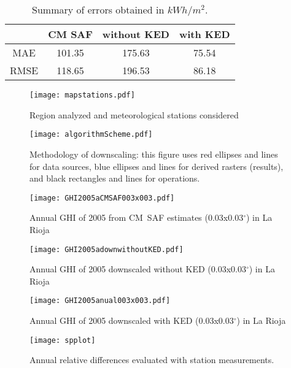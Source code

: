 \documentclass[authoryear, sort&compress]{elsarticle}
\begin{document}
\begin{table}[ht]
\begin{center}
\begin{tabular}{cccc}
  \hline
& CM SAF & without KED & with KED\\
\hline
MAE & 101.35 &  175.63& 75.54  \\ 
  RMSE & 118.65  & 196.53 & 86.18 \\ 
   \hline
\end{tabular}
\end{center}
\caption{Summary of errors obtained in $kWh/m^2$.}
\label{tab:ers}
\end{table}

\begin{figure}
\centering
\texttt{[image: mapstations.pdf]}
\caption{Region analyzed and meteorological stations considered}
\label{fig:mapstations}
\end{figure}

\begin{figure}
\centering
\texttt{[image: algorithmScheme.pdf]}
\caption{Methodology of downscaling: this figure uses red ellipses
and lines for data sources, blue ellipses and lines for derived
rasters (results), and black rectangles and lines for operations.
}
\label{fig:method}
\end{figure}

\begin{figure}
  \centering
  \texttt{[image: GHI2005aCMSAF003x003.pdf]}
  \caption{Annual GHI of 2005 from CM~SAF estimates (0.03x0.03$^\circ$) in La Rioja}
  \label{fig:cmsaf}
\end{figure}



\begin{figure}
  \centering
  \texttt{[image: GHI2005adownwithoutKED.pdf]}
  \caption{Annual GHI of 2005 downscaled without
    KED (0.03x0.03$^\circ$) in La Rioja}
  \label{fig:GHInoked}
\end{figure}

\begin{figure}
  \centering
  \texttt{[image: GHI2005anual003x003.pdf]}
  \caption{Annual GHI of 2005 downscaled with
    KED (0.03x0.03$^\circ$) in La Rioja}
  \label{fig:GHIked}
\end{figure}

\begin{figure}
  \centering
  \texttt{[image: spplot]}
  \caption{Annual relative differences evaluated with station measurements.}
  \label{fig:spplot}
\end{figure}
\end{document}
